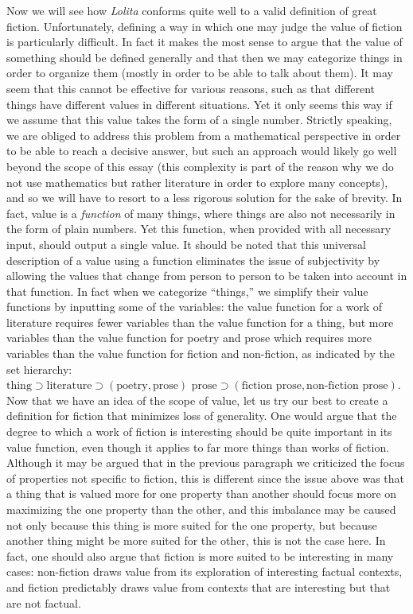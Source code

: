 \documentclass[12pt]{article}
\begin{document}
Now we will see how \textit{Lolita} conforms quite well to a valid definition of great fiction. Unfortunately, defining a way in which one may judge the value of fiction is particularly difficult. In fact it makes the most sense to argue that the value of something should be defined generally and that then we may categorize things in order to organize them (mostly in order to be able to talk about them). It may seem that this cannot be effective for various reasons, such as that different things have different values in different situations. Yet it only seems this way if we assume that this value takes the form of a single number. Strictly speaking, we are obliged to address this problem from a mathematical perspective in order to be able to reach a decisive answer, but such an approach would likely go well beyond the scope of this essay (this complexity is part of the reason why we do not use mathematics but rather literature in order to explore many concepts), and so we will have to resort to a less rigorous solution for the sake of brevity. In fact, value is a \textit{function} of many things, where things are also not necessarily in the form of plain numbers. Yet this function, when provided with all necessary input, should output a single value. It should be noted that this universal description of a value using a function eliminates the issue of subjectivity by allowing the values that change from person to person to be taken into account in that function. In fact when we categorize ``things,'' we simplify their value functions by inputting some of the variables: the value function for a work of literature requires fewer variables than the value function for a thing, but more variables than the value function for poetry and prose which requires more variables than the value function for fiction and non-fiction, as indicated by the set hierarchy: $\text{thing} \supset \text{literature} \supset (\text{poetry}, \text{prose}) \text{  prose} \supset (\text{fiction prose}, \text{non-fiction prose})$. Now that we have an idea of the scope of value, let us try our best to create a definition for fiction that minimizes loss of generality. One would argue that the degree to which a work of fiction is interesting should be quite important in its value function, even though it applies to far more things than works of fiction. Although it may be argued that in the previous paragraph we criticized the focus of properties not specific to fiction, this is different since the issue above was that a thing that is valued more for one property than another should focus more on maximizing the one property than the other, and this imbalance may be caused not only because this thing is more suited for the one property, but because another thing might be more suited for the other, this is not the case here. In fact, one should also argue that fiction is more suited to be interesting in many cases: non-fiction draws value from its exploration of interesting factual contexts, and fiction predictably draws value from contexts that are interesting but that are not factual. 
\end{document}
